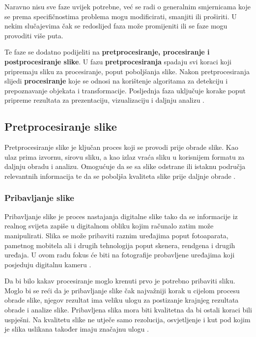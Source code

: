 \documentclass{foi}
\begin{document}
Naravno nisu sve faze uvijek potrebne, već se radi o generalnim smjernicama koje se prema specifičnostima problema mogu modificirati, smanjiti ili proširiti. U nekim slučajevima čak se redoslijed faza može promijeniti ili se faze mogu provoditi više puta.    

Te faze se dodatno podijeliti na \textbf{pretprocesiranje, procesiranje i postprocesiranje slike}. U fazu \textbf{pretprocesiranja} spadaju svi koraci koji pripremaju sliku za procesiranje, poput poboljšanja slike. Nakon pretprocesiranja slijedi \textbf{procesiranje} koje se odnosi na korištenje algoritama za detekciju i prepoznavanje objekata i transformacije. Posljednja faza uključuje korake poput pripreme rezultata za prezentaciju, vizualizaciju i daljnju analizu \cite{IamgeProcesingPhases}.

\pagebreak
\subsection{Pretprocesiranje slike}

Pretprocesiranje slike je ključan proces koji se provodi prije obrade slike. Kao ulaz prima izvornu, sirovu sliku, a kao izlaz vraća sliku u korisnijem formatu za daljnju obradu i analizu. Omogućuje da se sa slike odstrane ili istaknu područja relevantnih informacija te da se poboljša kvaliteta slike prije daljnje obrade \cite{Patel2023Oct}.


\subsubsection{Pribavljanje slike}

Pribavljanje slike je proces nastajanja digitalne slike tako da se informacije iz realnog svijeta zapiše u digitalnom obliku kojim računalo zatim može manipulirati. Slika se može pribaviti raznim uređajima poput fotoaparata, pametnog mobitela ali i drugih tehnologija poput skenera, rendgena i drugih uređaja. U ovom radu fokus će biti na fotografije probavljene uređajima koji posjeduju digitalnu kameru \cite{BibEntry2025Apr}.


Da bi bilo kakav procesiranje moglo krenuti prvo je potrebno pribaviti sliku. Moglo bi se reći da je pribavljanje slike čak najvažniji korak u cijelom procesu obrade slike, njegov rezultat ima veliku ulogu za postizanje krajnjeg rezultata obrade i analize slike. Pribavljena slika mora biti kvalitetna da bi ostali koraci bili uspješni. Na kvalitetu slike ne utječe samo rezolucija, osvjetljenje i kut pod kojim je slika uslikana također imaju značajnu ulogu \cite{BibEntry2025Apr}.
\end{document}
